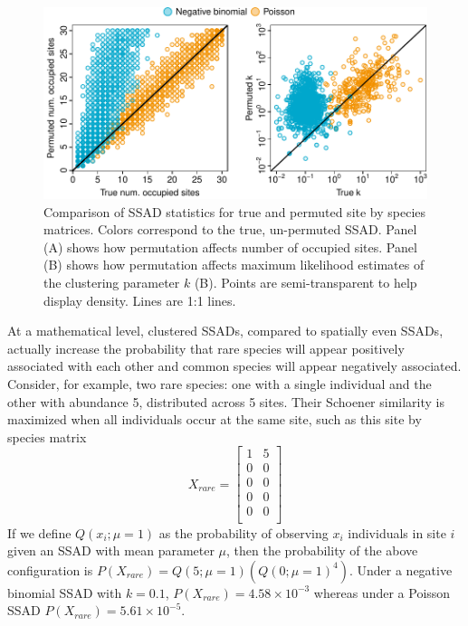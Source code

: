 \documentclass[
]{article}
\begin{document}
\begin{figure}

{\centering \includegraphics{RarePlusComMinus_files/figure-latex/ssadPerm_plot-1} 

}

\caption{Comparison of SSAD statistics for true and permuted site by species matrices. Colors correspond to the true, un-permuted SSAD. Panel (A) shows how permutation affects number of occupied sites. Panel (B) shows how permutation affects maximum likelihood estimates of the clustering parameter $k$ (B). Points are semi-transparent to help display density. Lines are 1:1 lines. \label{fig:ssadPerm}}\label{fig:ssadPerm_plot}
\end{figure}

At a mathematical level, clustered SSADs, compared to spatially even
SSADs, actually increase the probability that rare species will appear
positively associated with each other and common species will appear
negatively associated. Consider, for example, two rare species: one with
a single individual and the other with abundance 5, distributed across 5
sites. Their Schoener similarity is maximized when all individuals occur
at the same site, such as this site by species matrix \[
X_{rare} = \begin{bmatrix} 1 & 5 \\ 0 & 0 \\ 0 & 0 \\ 0 & 0 \\ 0 & 0 \\ \end{bmatrix}
\] If we define \(Q(x_i; \mu = 1)\) as the probability of observing
\(x_i\) individuals in site \(i\) given an SSAD with mean parameter
\(\mu\), then the probability of the above configuration is
\(P(X_{rare}) = Q(5; \mu = 1) \left(Q(0; \mu = 1)^{4}\right)\). Under a
negative binomial SSAD with \(k = 0.1\),
\(P(X_{rare}) = 4.58 \times 10^{-3}\) whereas under a Poisson SSAD
\(P(X_{rare}) = 5.61 \times 10^{-5}\).
\end{document}
